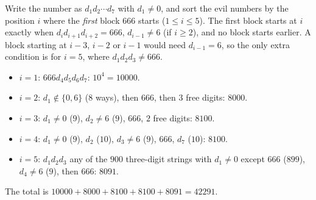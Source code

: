 Write the number as $d_1d_2\cdots d_7$ with $d_1\ne0$, and sort the evil numbers by the position $i$ where the \emph{first} block $666$ starts ($1\le i\le5$). The first block starts at $i$ exactly when $d_id_{i+1}d_{i+2}=666$, $d_{i-1}\ne6$ (if $i\ge2$), and no block starts earlier. A block starting at $i-3$, $i-2$ or $i-1$ would need $d_{i-1}=6$, so the only extra condition is for $i=5$, where $d_1d_2d_3\ne666$.
\begin{itemize}
\item $i=1$: $666d_4d_5d_6d_7$: $10^4=10000$.
\item $i=2$: $d_1\notin\{0,6\}$ ($8$ ways), then $666$, then $3$ free digits: $8000$.
\item $i=3$: $d_1\ne0$ ($9$), $d_2\ne6$ ($9$), $666$, $2$ free digits: $8100$.
\item $i=4$: $d_1\ne0$ ($9$), $d_2$ ($10$), $d_3\ne6$ ($9$), $666$, $d_7$ ($10$): $8100$.
\item $i=5$: $d_1d_2d_3$ any of the $900$ three-digit strings with $d_1\ne0$ except $666$ ($899$), $d_4\ne6$ ($9$), then $666$: $8091$.
\end{itemize}
The total is $10000+8000+8100+8100+8091=\boxed{42291}$.
